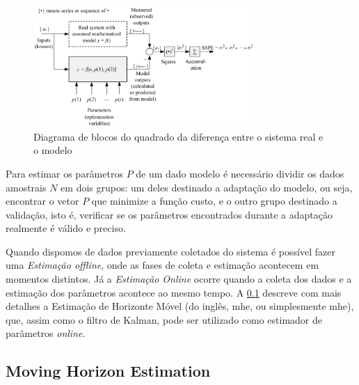 \begin{figure}
	\begin{center}
		\includegraphics[width=0.75\textwidth]{./5_images/fig_parameter_estimation.png} 
		\caption{Diagrama de blocos do quadrado da diferença entre o sistema real e o modelo}
		\label{fig:parameter_estimation}
	\end{center}
\end{figure}

Para estimar os parâmetros $P$ de um dado modelo é necessário dividir os dados amostrais
$N$ em dois grupos: um deles destinado a adaptação do modelo, ou seja, encontrar o vetor $P$
que minimize a função custo, e o outro grupo destinado a validação, isto é, verificar se os
parâmetros encontrados durante a adaptação realmente é válido e preciso.

Quando dispomos de dados previamente coletados do sistema é possível fazer uma \textit{Estimação
offline}, onde as fases de coleta e estimação acontecem em momentos distintos. Já a
\textit{Estimação Online} ocorre quando a coleta dos dados e a estimação dos parâmetros acontece
ao mesmo tempo. A \cref{subsec:moving_horizon_estimation} descreve com mais detalhes a
Estimação de Horizonte Móvel (do inglês, \acrlong{mhe}, ou simplesmente \acrshort{mhe}), que,
assim como o filtro de Kalman, pode ser utilizado como estimador de parâmetros \textit{online}.

\subsection{Moving Horizon Estimation}
\label{subsec:moving_horizon_estimation}

